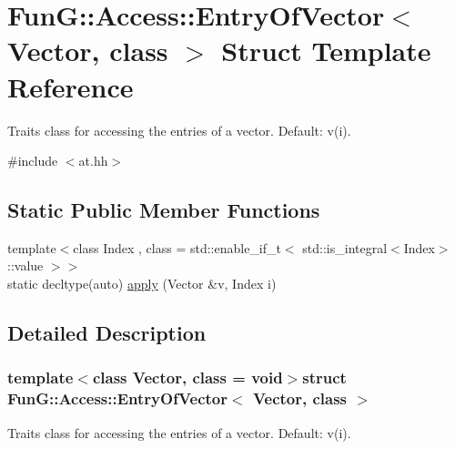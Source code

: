 \hypertarget{structFunG_1_1Access_1_1EntryOfVector}{\section{Fun\-G\-:\-:Access\-:\-:Entry\-Of\-Vector$<$ Vector, class $>$ Struct Template Reference}
\label{structFunG_1_1Access_1_1EntryOfVector}
}


Traits class for accessing the entries of a vector. Default\-: v(i).  




{\ttfamily \#include $<$at.\-hh$>$}

\subsection*{Static Public Member Functions}
\begin{DoxyCompactItemize}
\item 
{\footnotesize template$<$class Index , class  = std\-::enable\-\_\-if\-\_\-t$<$ std\-::is\-\_\-integral$<$\-Index$>$\-::value $>$$>$ }\\static decltype(auto) \hyperlink{structFunG_1_1Access_1_1EntryOfVector_a218d92e05d43db99ae2ef41bf390fe17}{apply} (Vector \&v, Index i)
\end{DoxyCompactItemize}


\subsection{Detailed Description}
\subsubsection*{template$<$class Vector, class = void$>$struct Fun\-G\-::\-Access\-::\-Entry\-Of\-Vector$<$ Vector, class $>$}

Traits class for accessing the entries of a vector. Default\-: v(i). 

